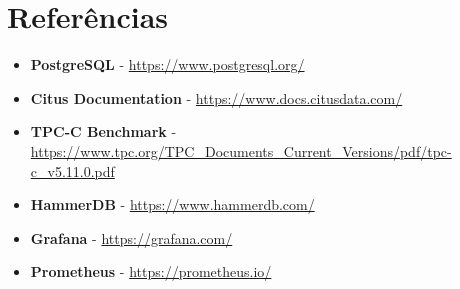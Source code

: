 \section{Referências}
\begin{itemize}
	\item \textbf{PostgreSQL} - \url{https://www.postgresql.org/}
	\item \textbf{Citus Documentation} - \url{https://www.docs.citusdata.com/}
	\item \textbf{TPC-C Benchmark} - \url{https://www.tpc.org/TPC_Documents_Current_Versions/pdf/tpc-c_v5.11.0.pdf}
	\item \textbf{HammerDB} - \url{https://www.hammerdb.com/}
	\item \textbf{Grafana} - \url{https://grafana.com/}
	\item \textbf{Prometheus} - \url{https://prometheus.io/}
\end{itemize}